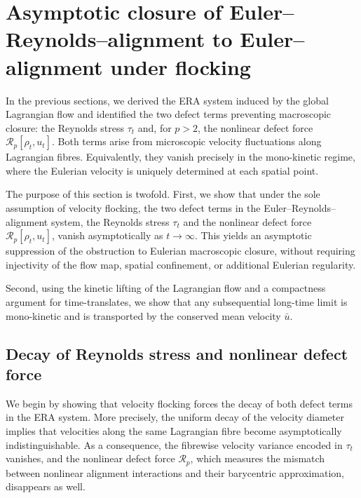 \documentclass[10pt,reqno]{amsart}
\numberwithin{equation}{section}
\newcommand{\calR}{\mathcal R}
\begin{document}
 
 
 
 
 
 
%
%
%                      
%
%

 
 

\section{Asymptotic closure of Euler--Reynolds--alignment to Euler--alignment under flocking}\label{sec:ac_ERA}

In the previous sections, we derived the ERA system induced by the global Lagrangian flow and identified the two defect terms preventing macroscopic closure: the Reynolds stress $\tau_t$ and, for $p>2$, the nonlinear defect force $\calR_p[\rho_t,u_t]$. Both terms arise from microscopic velocity fluctuations along Lagrangian fibres. Equivalently, they vanish precisely in the mono-kinetic regime, where the Eulerian velocity is uniquely determined at each spatial point.

The purpose of this section is twofold. First, we show that under the sole assumption of velocity flocking, the two defect terms in the Euler--Reynolds--alignment system, the Reynolds stress $\tau_t$ and the nonlinear defect force $\calR_p[\rho_t,u_t]$, vanish asymptotically as $t\to\infty$. This yields an asymptotic suppression of the obstruction to Eulerian macroscopic closure, without requiring injectivity of the flow map, spatial confinement, or additional Eulerian regularity.

Second, using the kinetic lifting of the Lagrangian flow and a compactness argument for time-translates, we show that any subsequential long-time limit is mono-kinetic and is transported by the conserved mean velocity $\bar u$.
 


%
%
%                      
%
%
 

\subsection{Decay of Reynolds stress and nonlinear defect force}

We begin by showing that velocity flocking forces the decay of both defect terms in the ERA system. More precisely, the uniform decay of the velocity diameter implies that velocities along the
same Lagrangian fibre become asymptotically indistinguishable. As a consequence, the fibrewise velocity variance encoded in $\tau_t$ vanishes, and the nonlinear defect force $\calR_p$, which measures the mismatch between nonlinear alignment interactions and their barycentric approximation, disappears as well.
\end{document}
